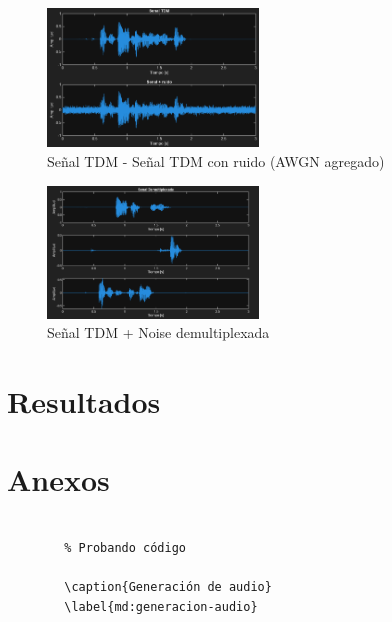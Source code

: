 \documentclass[conference]{IEEEtran}
\begin{document}
	
	\begin{figure}[h]
		\centering
		\includegraphics[width=0.5\textwidth]{media/tmd-signal-and-noise}
		\caption{Señal TDM - Señal TDM con ruido (AWGN agregado)}
		\label{fig:tmd-signal-and-noise}
	\end{figure}
	
	\begin{figure}[h]
		\centering
		\includegraphics[width=0.5\textwidth]{media/demux-tdm-signal-noise}
		\caption{Señal TDM + Noise demultiplexada}
		\label{fig:demux-tdm-signal-noise}
	\end{figure}
	
	
	
	\section{Resultados}
	
	
	
	
	\section{Anexos}
	
	\begin{verbatim}
		
		% Probando código
		
		\caption{Generación de audio}
		\label{md:generacion-audio}
	\end{verbatim}
\end{document}
